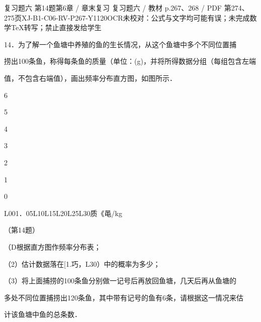 \begin{bankitem}{复习题六 第14题}{第6章 / 章末复习 复习题六 / 教材 p.267、268 / PDF 第274、275页}{XJ-B1-C06-RV-P267-Y1120}{OCR未校对：公式与文字均可能有误；未完成数学TeX转写；禁止直接发给学生}
\begin{ocrdraft}
\par
14．为了解一个鱼塘中养殖的鱼的生长情况，从这个鱼塘中多个不同位置捕
\par
捞出100条鱼，称得每条鱼的质量（单位：(g)，并将所得数据分组（每组包含左端
\par
值，不包含右端值），画出频率分布直方图，如图所示．
\par
6
\par
5
\par
4
\par
3
\par
2
\par
1
\par
0
\par
L001．05L10L15L20L25L30质《黾/kg
\par
（第14题）
\par
[教材p.268 / PDF第275页]
\par
（D根据直方图作频率分布表；
\par
（2）估计数据落在[1.巧，L30）中的概率为多少；
\par
（3）将上面捕捞的100条鱼分别做一记号后再放回鱼塘，几天后再从鱼塘的
\par
多处不同位置捕捞出120条鱼，其中带有记号的鱼有6条，请根据这一情况来估
\par
计该鱼塘中鱼的总条数．
\end{ocrdraft}
\end{bankitem}
